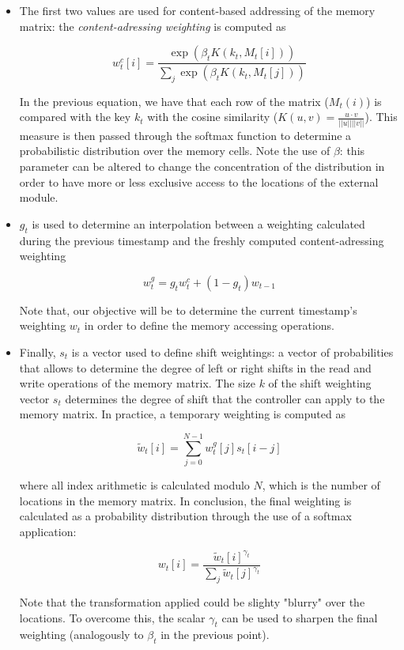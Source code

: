 \documentclass{article}
\begin{document}
\begin{itemize}
    \item The first two values are used for content-based addressing of the memory matrix: the \textit{content-adressing weighting} is computed as

        \begin{equation}
            w_t^c[i] = \frac{\exp(\beta_t K(k_t, M_t[i]))}{\sum_j \exp(\beta_t K(k_t, M_t[j]))}
        \end{equation}

    In the previous equation, we have that each row of the matrix ($M_t(i)$) is compared with the key $k_t$ with the cosine similarity ($K(u,v) = \frac{u \cdot v}{||u|| ||v||}$). This measure is then passed through the softmax function to determine a probabilistic distribution over the memory cells. Note the use of $\beta$: this parameter can be altered to change the concentration of the distribution in order to have more or less exclusive access to the locations of the external module.
    \item $g_t$ is used to determine an interpolation between a weighting calculated during the previous timestamp and the freshly computed content-adressing weighting

        \begin{equation}
            w_t^g = g_t w_t^c + (1-g_t)w_{t-1}
        \end{equation}

    Note that, our objective will be to determine the current timestamp's weighting $w_t$ in order to define the memory accessing operations.

    \item Finally, $s_t$ is a vector used to define shift weightings: a vector of probabilities that allows to determine the degree of left or right shifts in the read and write operations of the memory matrix. The size $k$ of the shift weighting vector $s_t$ determines the degree of shift that the controller can apply to the memory matrix. In practice, a temporary weighting is computed as
    
    \begin{equation}
        \tilde{w}_t[i] = \sum_{j=0}^{N-1}w_t^g[j]s_t[i-j]
    \end{equation}

    where all index arithmetic is calculated modulo $N$, which is the number of locations in the memory matrix. In conclusion, the final weighting is calculated as a probability distribution through the use of a softmax application:

    \begin{equation}
        w_t[i] = \frac{\tilde{w}_t[i]^{\gamma_t}}{\sum_j \tilde{w}_t[j]^{\gamma_t}}
    \end{equation}
    
    Note that the transformation applied could be slighty "blurry" over the locations. To overcome this, the scalar $\gamma_t$ can be used to sharpen the final weighting (analogously to $\beta_t$ in the previous point).
\end{itemize}
\end{document}
